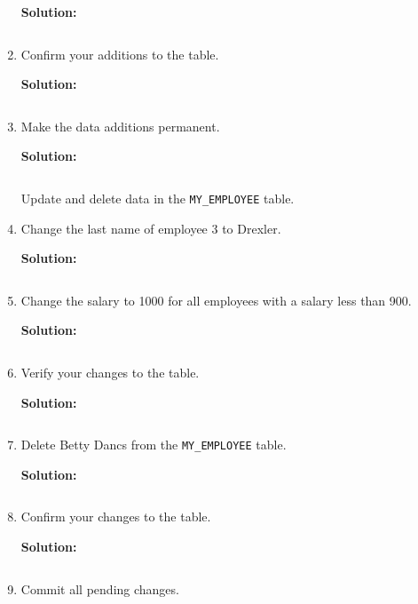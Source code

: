\begin{enumerate}
    \textbf{Solution: }
    \begin{lstlisting}[language=SQL]
    \end{lstlisting}
    \item  Confirm your additions to the table.
    
    \textbf{Solution: }
    \begin{lstlisting}[language=SQL]
    \end{lstlisting}
    \item  Make the data additions permanent.
    
    \textbf{Solution: }
    \begin{lstlisting}[language=SQL]
    \end{lstlisting}

Update and delete data in the \texttt{MY\_EMPLOYEE} table.
    \item  Change the last name of employee 3 to Drexler.
    
    \textbf{Solution: }
    \begin{lstlisting}[language=SQL]
    \end{lstlisting}
    \item  Change the salary to 1000 for all employees with a salary less than 900.
    
    \textbf{Solution: }
    \begin{lstlisting}[language=SQL]
    \end{lstlisting}
    \item  Verify your changes to the table.
    
    \textbf{Solution: }
    \begin{lstlisting}[language=SQL]
    \end{lstlisting}
    \item  Delete Betty Dancs from the \texttt{MY\_EMPLOYEE} table.
    
    \textbf{Solution: }
    \begin{lstlisting}[language=SQL]
    \end{lstlisting} 
    \item  Confirm your changes to the table.
    
    \textbf{Solution: }
    \begin{lstlisting}[language=SQL]
    \end{lstlisting} 
    \item  Commit all pending changes.
    

\end{enumerate}
